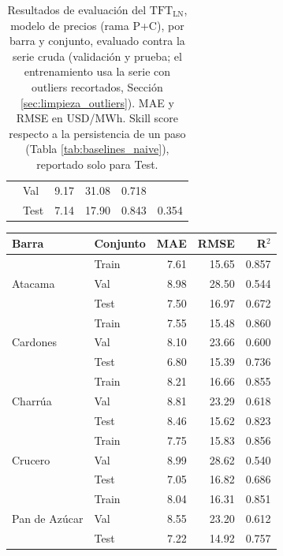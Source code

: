 \begin{table}[htbp]
\begin{tabular}{llrrrr}
            & Val   & 9.17 & 31.08 & 0.718 & \\
            & Test  & 7.14 & 17.90 & 0.843 & 0.354 \\
        \bottomrule
    \end{tabular}
    \vspace{0.2cm}
    \caption{Resultados de evaluación del $\text{TFT}_\text{LN}$, modelo de precios (rama P+C), por barra y conjunto, evaluado contra la serie cruda (validación y prueba; el entrenamiento usa la serie con outliers recortados, Sección \ref{sec:limpieza_outliers}). MAE y RMSE en USD/MWh. Skill score respecto a la persistencia de un paso (Tabla \ref{tab:baselines_naive}), reportado solo para Test.}
    \label{tab:tft_precios_resultados}
\end{table}
 
\begin{table}[htbp]
    \centering
    \small
    \begin{tabular}{llrrr}
        \toprule
        Barra & Conjunto & MAE & RMSE & R$^2$ \\
        \midrule
        \multirow{3}{*}{Atacama}
            & Train & 7.61 & 15.65 & 0.857 \\
            & Val   & 8.98 & 28.50 & 0.544 \\
            & Test  & 7.50 & 16.97 & 0.672 \\
        \midrule
        \multirow{3}{*}{Cardones}
            & Train & 7.55 & 15.48 & 0.860 \\
            & Val   & 8.10 & 23.66 & 0.600 \\
            & Test  & 6.80 & 15.39 & 0.736 \\
        \midrule
        \multirow{3}{*}{Charrúa}
            & Train & 8.21 & 16.66 & 0.855 \\
            & Val   & 8.81 & 23.29 & 0.618 \\
            & Test  & 8.46 & 15.62 & 0.823 \\
        \midrule
        \multirow{3}{*}{Crucero}
            & Train & 7.75 & 15.83 & 0.856 \\
            & Val   & 8.99 & 28.62 & 0.540 \\
            & Test  & 7.05 & 16.82 & 0.686 \\
        \midrule
        \multirow{3}{*}{Pan de Azúcar}
            & Train & 8.04 & 16.31 & 0.851 \\
            & Val   & 8.55 & 23.20 & 0.612 \\
            & Test  & 7.22 & 14.92 & 0.757 \\

\end{tabular}
\end{table}
